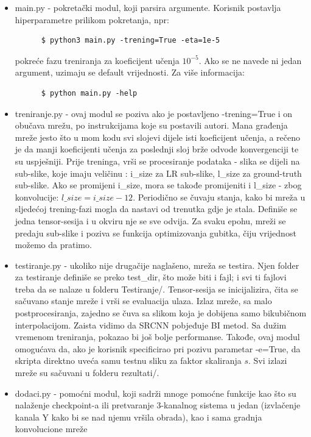 \documentclass[12pt]{report}
\numberwithin{equation}{section}
\begin{document}
  \begin{itemize}
  
   \item main.py - pokretački modul, koji parsira argumente. Korisnik postavlja hiperparametre prilikom pokretanja, npr: 
   \begin{lstlisting}
      $ python3 main.py -trening=True -eta=1e-5
   \end{lstlisting}
    pokreće fazu treniranja za koeficijent učenja $10^{-5}$. Ako se ne navede ni jedan argument, uzimaju se default vrijednosti. Za više informacija:
     \begin{lstlisting}
      $ python main.py -help
   \end{lstlisting}
    \item treniranje.py - ovaj modul se poziva ako je postavljeno -trening=True i on obučava mrežu, po instrukcijama koje su postavili autori. Mana građenja mreže jesto što u mom kodu svi slojevi dijele isti koeficijent učenja, a rečeno je da manji koeficijenti učenja za poslednji sloj brže odvode konvergenciji te su uspješniji. Prije treninga, vrši se procesiranje podataka - slika se dijeli na sub-slike, koje imaju veličinu : i\_size za LR sub-slike, l\_size za ground-truth sub-slike. Ako se promijeni i\_size, mora se takođe promijeniti i l\_size - zbog konvolucije: $l\_size=i\_size-12$. Periodično se čuvaju stanja, kako bi mreža u sljedećoj trening-fazi mogla da nastavi od trenutka gdje je stala. Definiše se jedna tensor-sesija i u okviru nje se sve odvija. Za svaku epohu,  mreži se predaju sub-slike i poziva se funkcija optimizovanja gubitka, čiju vrijednost možemo da pratimo. 
    
    \item testiranje.py - ukoliko nije drugačije naglašeno, mreža se testira. Njen folder za testiranje definiše se preko test\_dir, što može biti i fajl; i svi ti fajlovi treba da se nalaze u folderu Testiranje/.  Tensor-sesija se inicijalizira, čita se sačuvano stanje mreže i vrši se evaluacija ulaza. Izlaz mreže, sa malo postprocesiranja, zajedno se čuva sa slikom koja je dobijena samo bikubičnom interpolacijom. Zaista vidimo da SRCNN pobjeđuje BI metod. Sa dužim vremenom treniranja, pokazao bi još bolje performanse.  Takođe, ovaj modul omogućava da, ako je korisnik specificirao pri pozivu parametar -e=True, da skripta direktno uveća samu testnu sliku za faktor skaliranja $s$. Svi izlazi mreže su sačuvani u folderu rezultati/.
    
    \item dodaci.py - pomoćni modul, koji sadrži mnoge pomoćne funkcije kao što su nalaženje checkpoint-a ili pretvaranje 3-kanalnog sistema u jedan (izvlačenje kanala Y kako bi se nad njemu vršila obrada), kao i sama gradnja konvolucione mreže
  \end{itemize}
  
\end{document}
